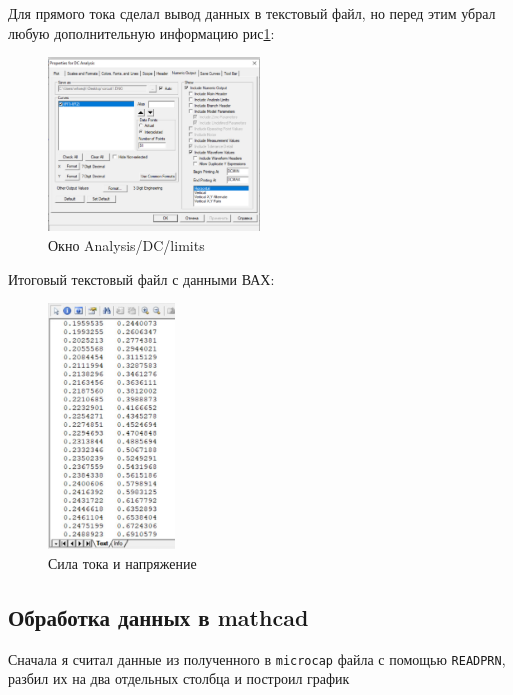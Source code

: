 	\clearpage
	\noindent Для прямого тока сделал вывод данных в текстовый файл, но перед этим убрал любую дополнительную информацию рис\ref{fig:06_main_mcp}: 
	\begin{figure}[H]
		\centering
		\includegraphics[width=0.5\textwidth]{img/06_main_mcp.jpg}
		\captionsetup{font=footnotesize}
		\caption{Окно Analysis/DC/limits}
		\label{fig:06_main_mcp}
	\end{figure}
	\noindent Итоговый текстовый файл с данными ВАХ:
	\begin{figure}[H]
		\centering
		\includegraphics[width=0.3\textwidth]{img/04_main_mcp.jpg}
		\captionsetup{font=footnotesize}
		\caption{Сила тока и напряжение}
		\label{fig:04_main_mcp}
	\end{figure}
\newpage
\subsection{Обработка данных в mathcad}
\noindent Сначала я считал данные из полученного в \texttt{microcap} файла с помощью \texttt{READPRN}, разбил их на два отдельных столбца и построил график 

